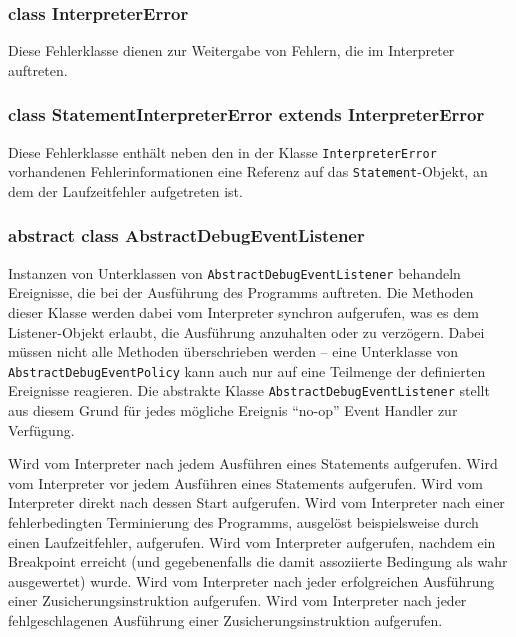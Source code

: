 \subsubsection{class InterpreterError}
Diese Fehlerklasse dienen zur Weitergabe von Fehlern, die im Interpreter auftreten.

\subsubsection{class StatementInterpreterError extends InterpreterError}
Diese Fehlerklasse enthält neben den in der Klasse \texttt{InterpreterError} vorhandenen Fehlerinformationen eine Referenz auf das \texttt{Statement}-Objekt, an dem der Laufzeitfehler aufgetreten ist.

\subsubsection{abstract class AbstractDebugEventListener}
Instanzen von Unterklassen von \texttt{AbstractDebugEventListener} behandeln Ereignisse, die bei der Ausführung des Programms auftreten. Die Methoden dieser Klasse werden dabei vom Interpreter synchron aufgerufen, was es dem Listener-Objekt erlaubt, die Ausführung anzuhalten oder zu verzögern. Dabei müssen nicht alle Methoden überschrieben werden -- eine Unterklasse von \texttt{AbstractDebugEventPolicy} kann auch nur auf eine Teilmenge der definierten Ereignisse reagieren. Die abstrakte Klasse \texttt{AbstractDebugEventListener} stellt aus diesem Grund für jedes mögliche Ereignis ``no-op'' Event Handler zur Verfügung.

\begin{description}
    Wird vom Interpreter nach jedem Ausführen eines Statements aufgerufen.
    Wird vom Interpreter vor jedem Ausführen eines Statements aufgerufen.
    Wird vom Interpreter direkt nach dessen Start aufgerufen.
    Wird vom Interpreter nach einer fehlerbedingten Terminierung des Programms, ausgelöst beispielsweise durch einen Laufzeitfehler, aufgerufen.
    Wird vom Interpreter aufgerufen, nachdem ein Breakpoint erreicht (und gegebenenfalls die damit assoziierte Bedingung als wahr ausgewertet) wurde.
    Wird vom Interpreter nach jeder erfolgreichen Ausführung einer Zusicherungsinstruktion aufgerufen.
    Wird vom Interpreter nach jeder fehlgeschlagenen Ausführung einer Zusicherungsinstruktion aufgerufen.
\end{description}
